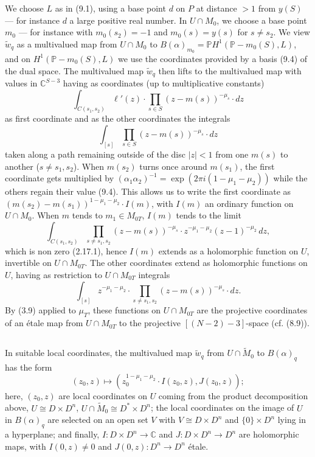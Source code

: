 \documentclass[12pt,a4paper]{article}
\theoremstyle{plain}
\theoremstyle{definition}
\theoremstyle{remark}
\begin{document}
We choose $L$ as in (9.1), using a base point $d$ on $P$ at distance $> 1$ from $y(S)$ --- for instance $d$ a large positive real number. In $U \cap M_0$, we choose a base point $m_0$ --- for instance with $m_0(s_2) = -1$ and $m_0(s) = y(s)$ for $s \neq s_2$. We view $\widetilde{w}_q$ as a multivalued map from $U \cap M_0$ to $B(\alpha)_{m_0} = \mathbb{P}H^1(\mathbb{P} - m_0(S), L)$, and on $H^1(\mathbb{P} - m_0(S), L)$ we use the coordinates provided by a basis (9.4) of the dual space. The multivalued map $\widetilde{w}_q$ then lifts to the multivalued map with values in $\mathbb{C}^{S-3}$ having as coordinates (up to multiplicative constants)
\[
\int_{C(s_1, s_2)} \ell'(z) \cdot \prod_{s \in S} (z - m(s))^{-\mu_s} \cdot dz
\]
as first coordinate and as the other coordinates the integrals
\[
\int_{[s]} \prod_{s \in S} (z - m(s))^{-\mu_s} \cdot dz
\]
taken along a path remaining outside of the disc $|z| < 1$ from one $m(s)$ to another ($s \neq s_1, s_2$). When $m(s_2)$ turns once around $m(s_1)$, the first coordinate gets multiplied by $(\alpha_1 \alpha_2)^{-1} = \exp(2\pi i(1 - \mu_1 - \mu_2))$ while the others regain their value (9.4). This allows us to write the first coordinate as $(m(s_2) - m(s_1))^{1 - \mu_1 - \mu_2} \cdot I(m)$, with $I(m)$ an ordinary function on $U \cap M_0$. When $m$ tends to $m_1 \in M_{0T}$, $I(m)$ tends to the limit
\[
\int_{C(s_1, s_2)} \prod_{s \neq s_1, s_2} (z - m(s))^{-\mu_s} \cdot z^{-\mu_1 - \mu_2} (z - 1)^{-\mu_2} \, dz,
\]
which is non zero (2.17.1), hence $I(m)$ extends as a holomorphic function on $U$, invertible on $U \cap M_{0T}$. The other coordinates extend as holomorphic functions on $U$, having as restriction to $U \cap M_{0T}$ integrals
\[
\int_{[s]} z^{-\mu_1 - \mu_2} \cdot \prod_{s \neq s_1, s_2} (z - m(s))^{-\mu_s} \cdot dz.
\]
By (3.9) applied to $\mu_T$, these functions on $U \cap M_{0T}$ are the projective coordinates of an \'etale map from $U \cap M_{0T}$ to the projective $[(N - 2) - 3]$-space (cf. (8.9)).

\subsection{}
\label{9.6}

In suitable local coordinates, the multivalued map $\widetilde{w}_q$ from $U \cap \widetilde{M}_0$ to $B(\alpha)_q$ has the form
\[
(z_0, z) \mapsto (z_0^{1 - \mu_1 - \mu_2} \cdot I(z_0, z), J(z_0, z));
\]
here, $(z_0, z)$ are local coordinates on $U$ coming from the product decomposition above, $U \cong D \times D^n$, $U \cap \widetilde{M}_0 \cong D^* \times D^n$; the local coordinates on the image of $U$ in $B(\alpha)_q$ are selected on an open set $V$ with $V \cong D \times D^n$ and $\{0\} \times D^n$ lying in a hyperplane; and finally, $I : D \times D^n \to \mathbb{C}$ and $J : D \times D^n \to D^n$ are holomorphic maps, with $I(0, z) \neq 0$ and $J(0, z) : D^n \to D^n$ \'etale.
\end{document}
